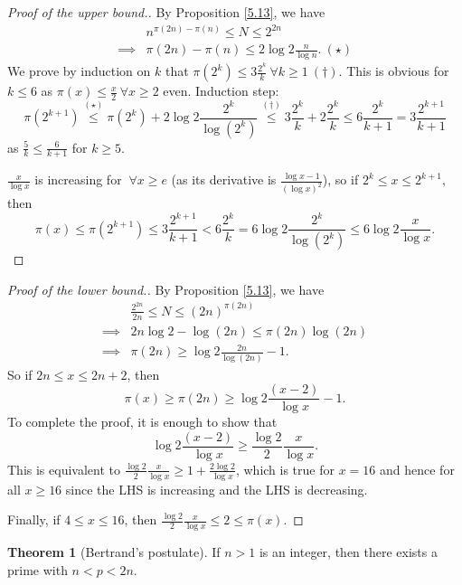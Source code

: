 \documentclass{article}
\theoremstyle{definition}
\newtheorem{theorem}{Theorem}[section]
\begin{document}
\begin{proof}[Proof of the upper bound.]
    By Proposition \ref{5.13}, we have 
    \begin{align*}
        &n^{\pi(2n)-\pi(n)} \le N \le 2^{2n} \\
        \implies &\pi(2n)-\pi(n) \le 2 \log 2 \frac{n}{\log n}. ~(\star)
    \end{align*}
    We prove by induction on $k$ that $\pi(2^k) \le 3 \frac{2^k}{k} ~\forall k\ge 1 ~(\dagger)$. This is obvious for $k\le 6$ as $\pi(x)\le \frac{x}{2} ~\forall x\ge 2$ even. Induction step: $$\pi(2^{k+1}) \stackrel{(\star)}{\le} \pi(2^k) + 2\log 2 \frac{2^k}{\log(2^k)} \stackrel{(\dagger)}{\le} 3\frac{2^k}{k} + 2\frac{2^k}{k} \le 6 \frac{2^k}{k+1} = 3\frac{2^{k+1}}{k+1}$$
    as $\frac{5}{k}\le \frac{6}{k+1}$ for $k\ge 5$.
    \vspace{1mm}
    
    $\frac{x}{\log x}$ is increasing for $~\forall x \ge e$ (as its derivative is $\frac{\log x-1}{(\log x)^2}$), so if $2^k\le x \le 2^{k+1}$, then 
    \[
    \pi(x) \le \pi(2^{k+1}) \le 3\frac{2^{k+1}}{k+1} < 6\frac{2^k}{k} = 6\log 2 \frac{2^k}{\log(2^k)}\le 6 \log 2 \frac{x}{\log x}.
    \]
\end{proof}
\begin{proof}[Proof of the lower bound.]
    By Proposition \ref{5.13}, we have 
    \begin{align*}
    &\frac{2^{2n}}{2n} \le N \le  (2n)^{\pi(2n)} \\
    \implies &2n \log 2 - \log(2n) \le \pi(2n) \log(2n) \\
    \implies &\pi(2n) \ge \log 2 \frac{2n}{\log(2n)} -1.
    \end{align*}
    So if $2n\le x\le 2n+2$, then $$\pi(x) \ge \pi(2n) \ge \log 2 \frac{(x-2)}{\log x}-1.$$
    To complete the proof, it is enough to show that \[
    \log 2 \frac{(x-2)}{\log x} \ge \frac{\log 2}{2} \frac{x}{\log x}.
    \]
    This is equivalent to $\frac{\log 2}{2}\frac{x}{\log x}\ge 1 + \frac{2\log2}{\log x}$, which is true for $x=16$ and hence for all $x\ge 16$ since the LHS is increasing and the LHS is decreasing.
    \vspace{1mm}
    
    Finally, if $4\le x\le 16$, then $\frac{\log 2}{2}\frac{x}{\log x} \le 2 \le \pi(x)$.
\end{proof}
\begin{theorem}[Bertrand's postulate]
    If $n>1$ is an integer, then there exists a prime with $n<p<2n$.
\end{theorem}
\end{document}
